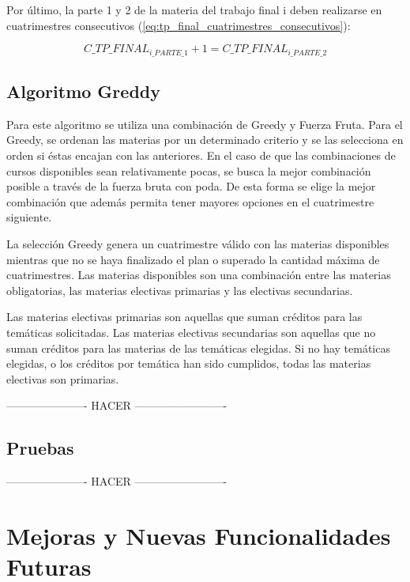 \documentclass[a4paper]{article}
\begin{document}
Por último, la parte 1 y 2 de la materia del trabajo final i deben realizarse en cuatrimestres consecutivos (\ref{eq:tp_final_cuatrimestres_consecutivos}):

\begin{equation}\label{eq:tp_final_cuatrimestres_consecutivos}
C\_TP\_FINAL_{i\_PARTE\_1} + 1 = C\_TP\_FINAL_{i\_PARTE\_2}
\end{equation}


\subsection{Algoritmo Greddy}

Para este algoritmo se utiliza una combinación de Greedy y Fuerza Fruta. Para el Greedy, se ordenan las materias por un determinado criterio y se las selecciona en orden si éstas encajan con las anteriores. En el caso de que las combinaciones de cursos disponibles sean relativamente pocas, se busca la mejor combinación posible a través de la fuerza bruta con poda. De esta forma se elige la mejor combinación que además permita tener mayores opciones en el cuatrimestre siguiente.\newline

La selección Greedy genera un cuatrimestre válido con las materias disponibles mientras que no se haya finalizado el plan o superado la cantidad máxima de cuatrimestres. Las materias disponibles son una combinación entre las materias obligatorias, las materias electivas primarias y las electivas secundarias.

Las materias electivas primarias son aquellas que suman créditos para las temáticas solicitadas. Las materias electivas secundarias son aquellas que no suman créditos para las materias de las temáticas elegidas. Si no hay temáticas elegidas, o los créditos por temática han sido cumplidos, todas las materias electivas son primarias.



---------------------- HACER -------------------------


\subsection{Pruebas}
---------------------- HACER -------------------------


\newpage
\section{Mejoras y Nuevas Funcionalidades Futuras}
\end{document}
